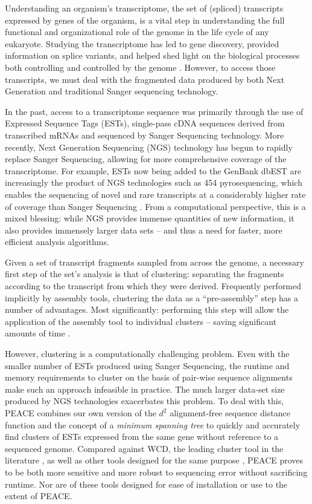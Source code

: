 \documentclass[a4,center,fleqn]{NAR}
\newcommand{\peace} {{\small PEACE}}
\newcommand{\wcd} {{\small WCD}}
\begin{document}
Understanding an organism's transcriptome, the set of (spliced)
transcripts expressed by genes of the organism, is a vital step in
understanding the full functional and organizational role of the
genome in the life cycle of any eukaryote.  Studying the transcriptome
has led to gene discovery, provided information on splice variants,  
and helped shed light on the biological processes both controlling and
controlled by the genome \cite{Nagaraj07}.  However, to access those
transcripts, we must deal with the fragmented data produced by
both Next Generation and traditional Sanger sequencing technology.

In the past, access to a transcriptome sequence was primarily
through the use of Expressed Sequence Tags (ESTs), single-pass cDNA
sequences derived from transcribed mRNAs and sequenced by Sanger
Sequencing technology.  More recently, Next Generation Sequencing
(NGS) technology has begun to rapidly replace Sanger Sequencing,
allowing for more comprehensive coverage of the transcriptome.  For
example, ESTs now being added to the GenBank dbEST are increasingly
the product of NGS technologies such as 454 pyrosequencing, which
enables the sequencing of novel and rare transcripts at a considerably
higher rate of coverage than Sanger Sequencing
\cite{Cheung2006,Emrich2007}.  From a computational perspective, this
is a mixed blessing: while NGS provides immense quantities of new
information, it also provides immensely larger data sets -- and thus a
need for faster, more efficient analysis algorithms.

\enlargethispage{-65.1pt}

Given a set of transcript fragments sampled from across the genome, a
necessary first step of the set's analysis is that of clustering: separating
the fragments according to the transcript from which they were
derived.  Frequently performed implicitly by assembly tools,
clustering the data as a ``pre-assembly'' step has a number of
advantages.  Most significantly: performing this step will
allow the application of the assembly tool to individual clusters --
saving significant amounts of time \cite{Hazelhurst08a}.  

However, clustering is a computationally challenging problem.  Even
with the smaller number of ESTs produced using Sanger Sequencing, the
runtime and memory requirements to cluster on the basis of pair-wise
sequence alignments make such an approach infeasible in practice.  The
much larger data-set size produced by NGS technologies exacerbates
this problem.  To deal with this, \peace\/ combines our own version of
the $d^2$ alignment-free sequence distance function \cite{Hide94} and
the concept of a {\it minimum spanning tree} \cite{Prim57} to quickly
and accurately find clusters of ESTs expressed from the same gene
without reference to a sequenced genome.  Compared against \wcd, the
leading cluster tool in the literature \cite{Hazelhurst08a}, as well as
other tools designed for the same purpose 
\cite{Burke99,Slater00,Huang99,Parkinson02,Kalyanaraman03,Malde03,
  Ptitsyn05,Hazelhurst08a,Picardi09}, \peace\/ proves to be both more
sensitive and more robust to sequencing error without sacrificing
runtime.  Nor are of these tools designed for ease of installation or
use to the extent of \peace.
\end{document}
